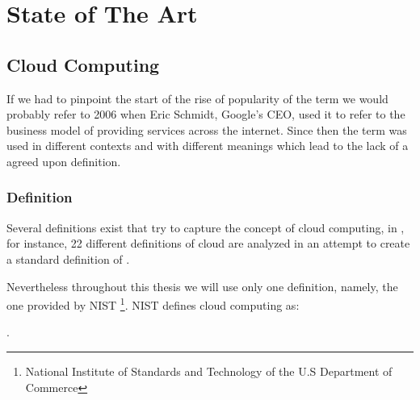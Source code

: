 \chapter{State of The Art} \label{chap:context}
\section*{}
    \section{Cloud Computing}
    	If we had to pinpoint the start of the rise of popularity of the term  we would probably refer to 2006 when Eric Schmidt, Google's CEO, used it to refer to the business model of providing services across the internet\cite{Zhang2010}.  Since then the term was used in different contexts and with different meanings which lead to the lack of a agreed upon definition\cite{Zhang2010}.
    
    
    	\subsection{Definition}
        Several definitions exist that try to capture the concept of cloud computing, in  \cite{Vaquero2008}, for instance, 22 different definitions of cloud are analyzed in an attempt to create a standard definition of . 
        
        Nevertheless throughout this thesis we will use only one definition, namely, the one provided by NIST \footnote{National Institute of Standards and Technology of the U.S Department of Commerce}. NIST defines cloud computing as: 
        
        . 
        
